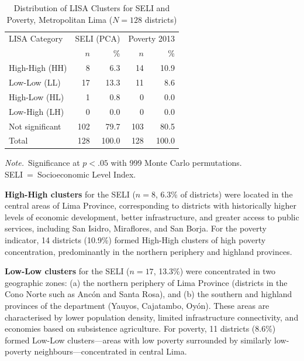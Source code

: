 \documentclass[12pt,a4paper,twoside]{article}
\begin{document}
\begin{table}[htbp]
  \centering
  \footnotesize
  \caption{Distribution of LISA Clusters for SELI and Poverty, Metropolitan Lima
           ($N = 128$ districts)}
  \label{tab:lisa_freq}
  \begin{tabular}{lrrrr}
    \toprule
    LISA Category & \multicolumn{2}{c}{SELI (PCA)} & \multicolumn{2}{c}{Poverty 2013} \\
    & $n$ & \% & $n$ & \% \\
    \midrule
    High-High (HH)    & 8  & 6.3  & 14 & 10.9 \\
    Low-Low (LL)      & 17 & 13.3 & 11 & 8.6  \\
    High-Low (HL)     & 1  & 0.8  & 0  & 0.0  \\
    Low-High (LH)     & 0  & 0.0  & 0  & 0.0  \\
    Not significant   & 102 & 79.7 & 103 & 80.5 \\
    \midrule
    Total             & 128 & 100.0 & 128 & 100.0 \\
    \bottomrule
  \end{tabular}

  \vspace{4pt}
  \begin{minipage}{0.9\textwidth}
  \footnotesize\textit{Note.}\ Significance at $p < .05$ with 999 Monte Carlo
  permutations. SELI~=~Socioeconomic Level Index.
  \end{minipage}
\end{table}

\textbf{High-High clusters} for the SELI ($n = 8$, 6.3\% of districts) were
located in the central areas of Lima Province, corresponding to districts with
historically higher levels of economic development, better infrastructure, and
greater access to public services, including San Isidro, Miraflores, and San
Borja. For the poverty indicator, 14 districts (10.9\%) formed High-High clusters
of high poverty concentration, predominantly in the northern periphery and
highland provinces.

\textbf{Low-Low clusters} for the SELI ($n = 17$, 13.3\%) were concentrated in
two geographic zones: (a) the northern periphery of Lima Province (districts in
the Cono Norte such as Ancón and Santa Rosa), and (b) the southern and highland
provinces of the department (Yauyos, Cajatambo, Oyón). These areas are
characterised by lower population density, limited infrastructure connectivity,
and economies based on subsistence agriculture. For poverty, 11 districts (8.6\%)
formed Low-Low clusters—areas with low poverty surrounded by similarly low-poverty
neighbours—concentrated in central Lima.
\end{document}

